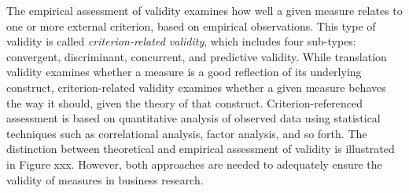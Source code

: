 The empirical assessment of validity examines how well a given measure relates to one or more external criterion, based on empirical observations. This type of validity is called \textit{criterion-related validity}, which includes four sub-types: convergent, discriminant, concurrent, and predictive validity. While translation validity examines whether a measure is a good reflection of its underlying construct, criterion-related validity examines whether a given measure behaves the way it should, given the theory of that construct. Criterion-referenced assessment is based on quantitative analysis of observed data using statistical techniques such as correlational analysis, factor analysis, and so forth. The distinction between theoretical and empirical assessment of validity is illustrated in Figure xxx. However, both approaches are needed to adequately ensure the validity of measures in business research.


